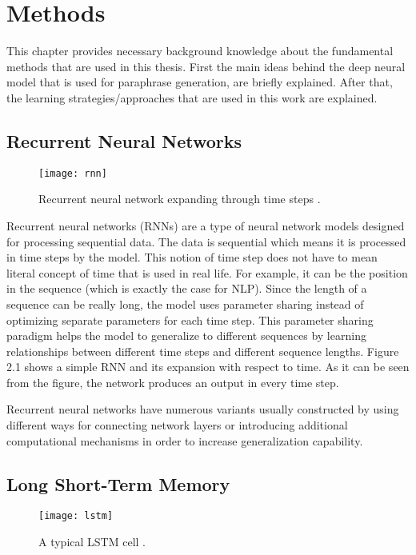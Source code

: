 \chapter{Methods}\label{methods}

This chapter provides necessary background knowledge about the fundamental methods that are used in this thesis. First the main ideas behind the deep neural model that is used for paraphrase generation, are briefly explained. After that, the learning strategies/approaches that are used in this work are explained.

\section{Recurrent Neural Networks}

\begin{figure}[t]
\texttt{[image: rnn]}
\centering
\caption{Recurrent neural network expanding through time steps \cite{zhao}.}
\end{figure}

Recurrent neural networks (RNNs) are a type of neural network models designed for processing sequential data. The data is sequential which means it is processed in time steps by the model. This notion of time step does not have to mean literal concept of time that is used in real life. For example, it can be the position in the sequence (which is exactly the case for NLP). Since the length of a sequence can be really long, the model uses parameter sharing instead of optimizing separate parameters for each time step. This parameter sharing paradigm helps the model to generalize to different sequences by learning relationships between different time steps and different sequence lengths. Figure 2.1 shows a simple RNN and its expansion with respect to time. As it can be seen from the figure, the network produces an output in every time step.

Recurrent neural networks have numerous variants usually constructed by using different ways for connecting network layers or introducing additional computational mechanisms in order to increase generalization capability. 

\section{Long Short-Term Memory}

\begin{figure}[t]
\texttt{[image: lstm]}
\centering
\caption{A typical LSTM cell \cite{paszke}.}
\end{figure}

